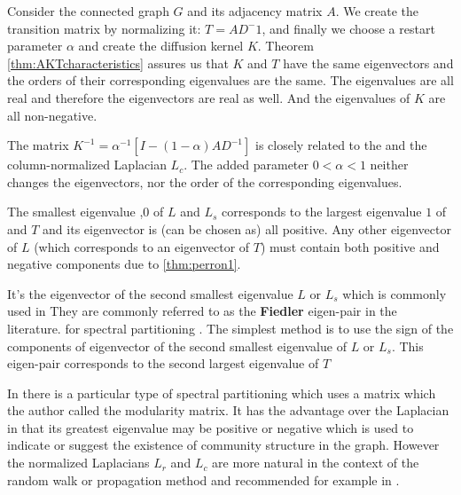 \documentclass[a4paper,10pt]{article}
\newcommand{\lt}{<}
\theoremstyle{definition}
\theoremstyle{remark}
\theoremstyle{plain}
\begin{document}
Consider the connected graph $G$ and its adjacency matrix $A$. We create the transition
matrix by normalizing it: $T = AD^-1$, and finally we choose a restart parameter
$\alpha$ and create the diffusion kernel $K$. Theorem
\ref{thm:AKTcharacteristics} assures us that $K$ and $T$ have the same
eigenvectors and the orders of their corresponding eigenvalues are the same. The
eigenvalues are all real and therefore the eigenvectors are real as well. And
the eigenvalues of $K$ are all non-negative.

The matrix $K^{-1} = \alpha^{-1} [I - (1- \alpha) AD^{-1}]$ is closely related to the
and the column-normalized Laplacian $L_c$. The added parameter $0 \lt \alpha \lt 1$
neither changes the eigenvectors, nor the order of the corresponding eigenvalues.

The smallest eigenvalue ,$0$ of $L$ and $L_s$
corresponds to the largest eigenvalue $1$ of and $T$ and its eigenvector is
(can be chosen as) all positive. 
Any other eigenvector of $L$ (which corresponds to an eigenvector of $T$) must
contain both positive and negative components due to \ref{thm:perron1}.

It's the eigenvector of the second smallest
eigenvalue $L$ or $L_s$ which is commonly used in 
They are commonly referred to as the \textbf{Fiedler} eigen-pair in the literature.
for spectral partitioning \cite{naumov2016parallel}. The simplest method is to
use the sign of the components of
eigenvector of the second smallest eigenvalue of $L$ or $L_s$.
This eigen-pair corresponds to the second largest eigenvalue of $T$

In \textcite{newman2006modularity} there is a particular type of spectral
partitioning which uses a matrix which the author called the modularity matrix.
It has the advantage over the Laplacian in that its greatest eigenvalue may be
positive or negative which is used to indicate or suggest the existence of
community structure in the graph. However the normalized Laplacians $L_r$ and
$L_c$ are more natural in the context of the random walk or propagation method
and recommended for example in \cite{von2007tutorial}.
\end{document}
